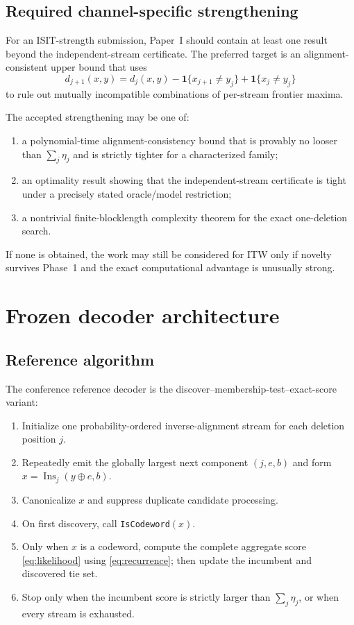 \documentclass[11pt]{article}
\theoremstyle{definition}
\theoremstyle{remark}
\newcommand{\ind}{\mathbf{1}}
\newcommand{\Ins}{\operatorname{Ins}}
\begin{document}
\subsection{Required channel-specific strengthening}

For an ISIT-strength submission, Paper~I should contain at least one result beyond the independent-stream certificate. The preferred target is an alignment-consistent upper bound that uses
\[
 d_{j+1}(x,y)=d_j(x,y)
 -\ind\{x_{j+1}\ne y_j\}
 +\ind\{x_j\ne y_j\}
\]
to rule out mutually incompatible combinations of per-stream frontier maxima.

The accepted strengthening may be one of:
\begin{enumerate}
  \item a polynomial-time alignment-consistency bound that is provably no looser than $\sum_j\eta_j$ and is strictly tighter for a characterized family;
  \item an optimality result showing that the independent-stream certificate is tight under a precisely stated oracle/model restriction;
  \item a nontrivial finite-blocklength complexity theorem for the exact one-deletion search.
\end{enumerate}

If none is obtained, the work may still be considered for ITW only if novelty survives Phase~1 and the exact computational advantage is unusually strong.

\section{Frozen decoder architecture}

\subsection{Reference algorithm}

The conference reference decoder is the discover--membership-test--exact-score variant:

\begin{enumerate}
  \item Initialize one probability-ordered inverse-alignment stream for each deletion position $j$.
  \item Repeatedly emit the globally largest next component $(j,e,b)$ and form $x=\Ins_j(y\oplus e,b)$.
  \item Canonicalize $x$ and suppress duplicate candidate processing.
  \item On first discovery, call \texttt{IsCodeword}$(x)$.
  \item Only when $x$ is a codeword, compute the complete aggregate score \cref{eq:likelihood} using \cref{eq:recurrence}; then update the incumbent and discovered tie set.
  \item Stop only when the incumbent score is strictly larger than $\sum_j\eta_j$, or when every stream is exhausted.
\end{enumerate}
\end{document}
